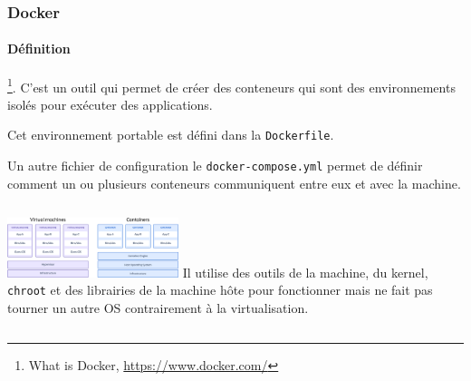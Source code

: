 \documentclass{beamer}
\begin{document}
    \begin{frame}
        \transdissolve
        \frametitle{Docker}
        \framesubtitle{Définition}
        \footnote{What is Docker, \url{https://www.docker.com/}}.
        \bigbreak
        C'est un outil qui permet de créer des conteneurs qui sont des environnements isolés pour exécuter des applications.

        Cet environnement portable est défini dans la \lstinline{Dockerfile}.

        Un autre fichier de configuration le \lstinline{docker-compose.yml} permet de définir comment un ou plusieurs conteneurs communiquent entre eux et avec la machine.
        \bigbreak
        \begin{columns}
            \centering
            \includegraphics[width=5cm]{image/docker-vs-vm.png}\footnotemark
            Il utilise des outils de la machine, du kernel, \lstinline{chroot} et des librairies de la machine hôte pour fonctionner mais ne fait pas tourner un autre OS contrairement à la virtualisation.
        \end{columns}
    \end{frame}
\end{document}
